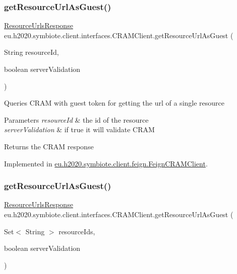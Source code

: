 \subsubsection{\texorpdfstring{get\+Resource\+Url\+As\+Guest()}{getResourceUrlAsGuest()}\hspace{0.1cm}{\footnotesize\ttfamily [1/2]}}
{\footnotesize\ttfamily \hyperlink{classeu_1_1h2020_1_1symbiote_1_1core_1_1internal_1_1cram_1_1ResourceUrlsResponse}{Resource\+Urls\+Response} eu.\+h2020.\+symbiote.\+client.\+interfaces.\+C\+R\+A\+M\+Client.\+get\+Resource\+Url\+As\+Guest (\begin{DoxyParamCaption}\item[{String}]{resource\+Id,  }\item[{boolean}]{server\+Validation }\end{DoxyParamCaption})}

Queries C\+R\+AM with guest token for getting the url of a single resource


\begin{DoxyParams}{Parameters}
{\em resource\+Id} & the id of the resource \\
\hline
{\em server\+Validation} & if true it will validate C\+R\+AM \\
\hline
\end{DoxyParams}
\begin{DoxyReturn}{Returns}
the C\+R\+AM response 
\end{DoxyReturn}


Implemented in \hyperlink{classeu_1_1h2020_1_1symbiote_1_1client_1_1feign_1_1FeignCRAMClient_ae910045cbca31e3e36eb72149dced194}{eu.\+h2020.\+symbiote.\+client.\+feign.\+Feign\+C\+R\+A\+M\+Client}.

\mbox{\label{interfaceeu_1_1h2020_1_1symbiote_1_1client_1_1interfaces_1_1CRAMClient_a6786832b14a691accf53af3c825ae7e2}} 
\subsubsection{\texorpdfstring{get\+Resource\+Url\+As\+Guest()}{getResourceUrlAsGuest()}\hspace{0.1cm}{\footnotesize\ttfamily [2/2]}}
{\footnotesize\ttfamily \hyperlink{classeu_1_1h2020_1_1symbiote_1_1core_1_1internal_1_1cram_1_1ResourceUrlsResponse}{Resource\+Urls\+Response} eu.\+h2020.\+symbiote.\+client.\+interfaces.\+C\+R\+A\+M\+Client.\+get\+Resource\+Url\+As\+Guest (\begin{DoxyParamCaption}\item[{Set$<$ String $>$}]{resource\+Ids,  }\item[{boolean}]{server\+Validation }\end{DoxyParamCaption})}

